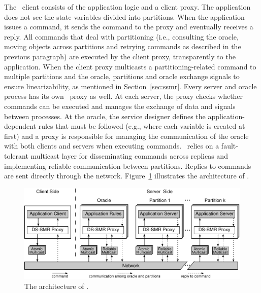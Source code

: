 The \dssmr\ client consists of the application logic and a client proxy.
The application does not see the state variables divided into partitions. When
the application issues a command, it sends the command to the proxy and
eventually receives a reply. All commands that deal with partitioning (i.e.,
consulting the oracle, moving objects across partitions and retrying commands as
described in the previous paragraph) are executed by the client proxy,
transparently to the application. When the client proxy multicasts a
partitioning-related command to multiple partitions and the oracle, partitions
and oracle exchange signals to ensure linearizability, as mentioned in
Section~\ref{sec:ssmr}. Every server and oracle process has its own \dssmr\
proxy as well. At each server, the proxy checks whether commands can be executed
and manages the exchange of data and signals between processes. At the oracle,
the service designer defines the application-dependent rules that must be
followed (e.g., where each variable is created at first) and a proxy is
responsible for managing the communication of the oracle with both clients and
servers when executing commands. \dssmr\ relies on a fault-tolerant multicast
layer for disseminating commands across replicas and implementing reliable
communication between partitions. Replies to commands are sent directly through
the network. Figure~\ref{fig:dssmr-arch} illustrates the architecture of \dssmr{}.

\begin{figure}
\begin{minipage}[b]{1.0\linewidth}
\centering
      \includegraphics[width=0.8\linewidth]{figures/dssmr-arch}
\end{minipage}
\caption{The architecture of \dssmrlong{}.}
\label{fig:dssmr-arch}
\end{figure}


